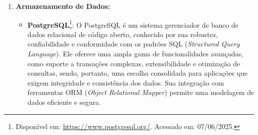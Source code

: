 \begin{enumerate}
\begin{itemize}
            \item \textbf{Redis}\footnote{Disponível em: \url{https://redis.io/}. Acessado em: 07/06/2025.}: 
                O Redis é um banco de dados em memória que se destaca pela alta performance e pela capacidade de suportar diferentes estruturas de dados, como \textit{strings}, listas e conjuntos. Essa versatilidade o torna ideal para usos em \textit{caching}, gerenciamento de sessões e filas de tarefas. Em conjunto com o BullMQ, o Redis fornece uma infraestrutura robusta para o processamento assíncrono, contribuindo para a escalabilidade e a estabilidade de aplicações que operam com grande volume de dados e execuções simultâneas. %
            \par\vspace{0.75\baselineskip}
        \end{itemize}

        \item \textbf{Armazenamento de Dados:}  
        \begin{itemize}
            \item \textbf{PostgreSQL}\footnote{Disponível em: \url{https://www.postgresql.org/}. Acessado em: 07/06/2025.}: 
                O PostgreSQL é um sistema gerenciador de banco de dados relacional de código aberto, conhecido por sua robustez, confiabilidade e conformidade com os padrões SQL (\textit{Structured Query Language}). Ele oferece uma ampla gama de funcionalidades avançadas, como suporte a transações complexas, extensibilidade e otimização de consultas, sendo, portanto, uma escolha consolidada para aplicações que exigem integridade e consistência dos dados. Sua integração com ferramentas ORM (\textit{Object Relational Mapper}) permite uma modelagem de dados eficiente e segura. %
            \par\vspace{0.25\baselineskip}
            
        

\end{itemize}
\end{enumerate}
